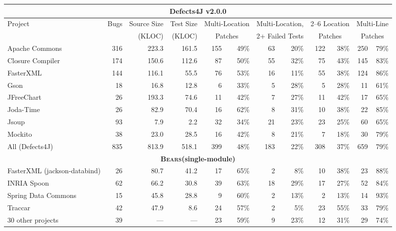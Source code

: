 \documentclass[10pt, conference]{IEEEtran}
\newcommand\bears{\textsc{Bears}\xspace}
\begin{document}
\begin{table}
\begin{center}
\begin{tabular}{l  rrr | rr rr rr rr }
\toprule
\multicolumn{12}{c}{\textbf{Defects4J v2.0.0}} \\
\midrule
\multirow{2}{*}{Project} & \multirow{2}{*}{Bugs} & Source Size & Test Size & \multicolumn{2}{c}{Multi-Location} & \multicolumn{2}{c}{Multi-Location,}      & \multicolumn{2}{c}{2--6 Location} & \multicolumn{2}{c}{Multi-Line} \\
            &          &  (KLOC) & (KLOC)&
\multicolumn{2}{c}{Patches}              & \multicolumn{2}{c}{2+ Failed Tests}   & \multicolumn{2}{c}{Patches}             & \multicolumn{2}{c}{Patches} \\
\midrule
Apache Commons & 316 & 223.3 & 161.5 & 155 & 49\% & 63 & 20\% & 122 & 38\%
& 250 & 79\%\\
Closure Compiler & 174 & 150.6 & 112.6 & 87 & 50\% & 55 & 32\% & 75 & 43\% & 145
& 83\% \\
FasterXML & 144 & 116.1 & 55.5 & 76 & 53\% & 16 & 11\% & 55 & 38\% & 124 & 86\%\\
Gson & 18 & 16.8 & 12.8 & 6 & 33\% & 5 & 28\% & 5 & 28\% & 11 & 61\% \\
JFreeChart  & 26 & 193.3 & 74.6  & 11 & 42\% & 7 & 27\% & 11 & 42\% & 17 & 65\%\\
Joda-Time & 26 & 82.9 & 70.4 & 16 & 62\% & 8 & 31\% & 10 & 38\% & 22 & 85\% \\
Jsoup & 93 & 7.9 & 2.2 & 32 & 34\% & 21 & 23\% & 23 & 25\% & 60 & 65\% \\
Mockito & 38 & 23.0 & 28.5 & 16 & 42\% & 8 & 21\% & 7 & 18\% & 30 & 79\% \\
\midrule
All (Defects4J) & 835 & 813.9 & 518.1 & 399 & 48\% & 183 & 22\% & 308 & 37\% & 659 & 79\%\\
\midrule
\multicolumn{12}{c}{\textbf{\bears (single-module)}} \\
\midrule
FasterXML (jackson-databind) & 26 & 80.7 & 41.2 & 17 & 65\% & 2 & 8\% & 10 & 38\% & 23 & 88\% \\
INRIA Spoon & 62 & 66.2 & 30.8  & 39 & 63\% & 18 & 29\% & 17 & 27\% & 52 & 84\% \\
Spring Data Commons & 15 & 45.8 & 28.8  & 9 & 60\% & 2 & 13\% & 2 & 13\% & 14 & 93\% \\
Traccar & 42 & 47.9 & 8.6 & 24 & 57\% & 2 & 5\% & 23 & 55\% & 33 & 79\% \\
30 other projects & 39 & --- & --- & 23 & 59\% & 9 & 23\% & 12 & 31\% & 29 & 74\% \\

\end{tabular}
\end{center}
\end{table}
\end{document}
